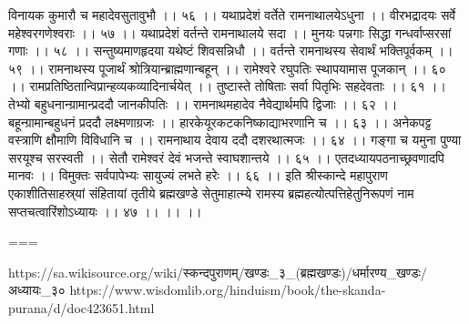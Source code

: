 विनायक कुमारौ च महादेवसुतावुभौ ।। ५६ ।।
यथाप्रदेशं वर्तेते रामनाथालयेऽधुना ।।
वीरभद्रादयः सर्वे महेश्वरगणेश्वराः ।। ५७ ।।
यथाप्रदेशं वर्तन्ते रामनाथालये सदा ।।
मुनयः पन्नगाः सिद्धा गन्धर्वाप्सरसां गणाः ।। ५८ ।।
सन्तुष्यमाणहृदया यथेष्टं शिवसन्निधौ ।।
वर्तन्ते रामनाथस्य सेवार्थं भक्तिपूर्वकम् ।। ५९ ।।
रामनाथस्य पूजार्थं श्रोत्रियान्ब्राह्मणान्बहून् ।।
रामेश्वरे रघुपतिः स्थापयामास पूजकान् ।। ६० ।।
रामप्रतिष्ठितान्विप्रान्हव्यकव्यादिनार्चयेत् ।।
तुष्टास्ते तोषिताः सर्वा पितृभिः सहदेवताः ।। ६१ ।।
तेभ्यो बहुधनान्ग्रामान्प्रददौ जानकीपतिः ।।
रामनाथमहादेव नैवेद्यार्थमपि द्विजाः ।। ६२ ।।
बहून्ग्रामान्बहुधनं प्रददौ लक्ष्मणाग्रजः ।।
हारकेयूरकटकनिष्काद्याभरणानि च ।। ६३ ।।
अनेकपट्ट वस्त्राणि क्षौमाणि विविधानि च ।।
रामनाथाय देवाय ददौ दशरथात्मजः ।। ६४ ।।
गङ्गा च यमुना पुण्या सरयूश्च सरस्वती ।।
सेतौ रामेश्वरं देवं भजन्ते स्वाघशान्तये ।। ६५ ।।
एतदध्यायपठनाच्छ्रवणादपि मानवः ।।
विमुक्तः सर्वपापेभ्यः सायुज्यं लभते हरेः ।। ६६ ।।
इति श्रीस्कान्दे महापुराण एकाशीतिसाहस्र्यां संहितायां तृतीये ब्रह्मखण्डे सेतुमाहात्म्ये रामस्य ब्रह्महत्योत्पत्तिहेतुनिरूपणं नाम सप्तचत्वारिंशोऽध्यायः ।। ४७ ।। ।। ।।

===

https://sa.wikisource.org/wiki/स्कन्दपुराणम्/खण्डः_३_(ब्रह्मखण्डः)/धर्मारण्य_खण्डः/अध्यायः_३०
https://www.wisdomlib.org/hinduism/book/the-skanda-purana/d/doc423651.html


